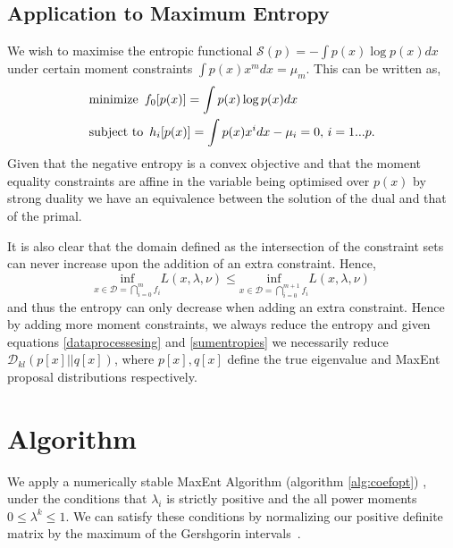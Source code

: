 \documentclass[journal]{IEEEtran}
\begin{document}
	\subsection{Application to Maximum Entropy}
	\label{entropydecreaseproof}
	We wish to maximise the entropic functional $\mathcal{S}(p) = -\int p(x)\log p(x)dx$ under certain moment constraints $\int p(x)x^{m}dx = \mu_{m}$. This can be written as,
	\begin{equation}
	\begin{aligned}
	&\text{minimize } \thinspace f_{0}[p(x)] = \int p(x)\log p(x)dx\\
	&\text{subject to } \thinspace h_{i}[p(x)] = \int p(x)x^{i}dx - \mu_{i} = 0, \thinspace i=1...p.
	\end{aligned}
	\end{equation}
	Given that the negative entropy is a convex objective and that the moment equality constraints are affine in the variable being optimised over $p(x)$ by strong duality we have an equivalence between the solution of the dual and that of the primal.
	
	It is also clear that the domain defined as the intersection of the constraint sets can never increase upon the addition of an extra constraint. Hence,
	\begin{equation}
	\underset{x \in \mathcal{D}=\bigcap\limits_{i=0}^{m}f_{i}}{\mbox{inf}}L(x,\lambda, \nu) \leq \underset{x \in \mathcal{D}=\bigcap\limits_{i=0}^{m+1}f_{i}}{\mbox{inf}}L(x,\lambda, \nu)
	\end{equation}
	and thus the entropy can only decrease when adding an extra constraint. Hence by adding more moment constraints, we always reduce the entropy and given equations \eqref{dataprocessesing} and \eqref{sumentropies} we necessarily reduce $\mathcal{D}_{kl}(p[x]||q[x])$, where $p[x], q[x]$ define the true eigenvalue and MaxEnt proposal distributions respectively.
	
	\section{Algorithm}
	We apply a numerically stable MaxEnt Algorithm (algorithm \ref{alg:coefopt}) \cite{bandyopadhyay2005maximum}, under the conditions that $\lambda_i$ is strictly positive and the all power moments $0 \leq \lambda^{k}\leq 1$. 
	We can satisfy these conditions by normalizing our positive definite matrix by the maximum of the Gershgorin intervals~\cite{Gershgorin1931}.
	
	\algrenewcommand\algorithmicindent{1.3em}
	\renewcommand{\algorithmicrequire}{\textbf{Input:}}
	\renewcommand{\algorithmicensure}{\textbf{Output:}}
	
\end{document}
